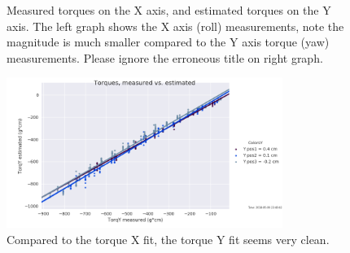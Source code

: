 \documentclass[preprint,12pt,3p]{elsarticle}
\begin{document}
\begin{figure}[tb!]
    \centering 
        \hfil %
        \hfil
        \caption{Measured torques on the X axis, and estimated torques on the Y axis.
            The left graph shows the X axis (roll) measurements, note the magnitude is much smaller
        compared to the Y axis torque (yaw) measurements. Please ignore the erroneous title on right graph.}
        \label{fig:torqxcolors}
\end{figure}


\begin{figure}[tb!]
\centering
            \includegraphics[width=0.8\textwidth]{images/round1/TorqY_Colors_Y.png}%
            \caption{Compared to the torque X fit, the torque Y fit seems very clean.}
            \label{fig:yfit}
\end{figure} 
\end{document}
